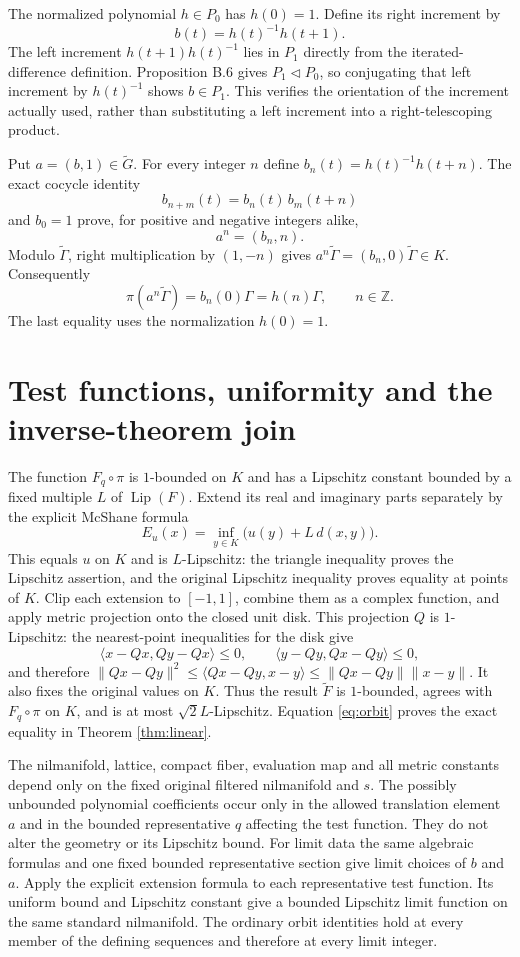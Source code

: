 \documentclass[11pt]{article}
\newcommand{\Z}{\mathbb Z}
\begin{document}
The normalized polynomial $h\in P_0$ has $h(0)=1$. Define its right
increment by
\[
 b(t)=h(t)^{-1}h(t+1).
\]
The left increment $h(t+1)h(t)^{-1}$ lies in $P_1$ directly from the
iterated-difference definition. Proposition B.6 gives $P_1\triangleleft
P_0$, so conjugating that left increment by $h(t)^{-1}$ shows
$b\in P_1$. This verifies the orientation of the increment actually
used, rather than substituting a left increment into a right-telescoping
product.

Put $a=(b,1)\in\widetilde G$. For every integer $n$ define
$b_n(t)=h(t)^{-1}h(t+n)$. The exact cocycle identity
\[
 b_{n+m}(t)=b_n(t)\,b_m(t+n)
\]
and $b_0=1$ prove, for positive and negative integers alike,
\[
 a^n=(b_n,n).
\]
Modulo $\widetilde\Gamma$, right multiplication by $(1,-n)$ gives
$a^n\widetilde\Gamma=(b_n,0)\widetilde\Gamma\in K$.
Consequently
\begin{equation}\label{eq:orbit}
 \pi(a^n\widetilde\Gamma)=b_n(0)\Gamma=h(n)\Gamma,
 \qquad n\in\Z.
\end{equation}
The last equality uses the normalization $h(0)=1$.

\section{Test functions, uniformity and the inverse-theorem join}

The function $F_q\circ\pi$ is $1$-bounded on $K$ and has a Lipschitz
constant bounded by a fixed multiple $L$ of $\operatorname{Lip}(F)$.
Extend its real and imaginary parts separately by the explicit McShane
formula
\[
 E_u(x)=\inf_{y\in K}\bigl(u(y)+L\,d(x,y)\bigr).
\]
This equals $u$ on $K$ and is $L$-Lipschitz: the triangle inequality
proves the Lipschitz assertion, and the original Lipschitz inequality
proves equality at points of $K$. Clip each extension to $[-1,1]$,
combine them as a complex function, and apply metric projection onto
the closed unit disk. This projection $Q$ is $1$-Lipschitz: the
nearest-point inequalities for the disk give
\[
 \langle x-Qx,Qy-Qx\rangle\leq0,\qquad
 \langle y-Qy,Qx-Qy\rangle\leq0,
\]
and therefore $\|Qx-Qy\|^2\leq\langle Qx-Qy,x-y\rangle
\leq\|Qx-Qy\|\|x-y\|$. It also fixes the original values on $K$.
Thus the result $\widetilde F$ is $1$-bounded, agrees with
$F_q\circ\pi$ on $K$, and is at most $\sqrt2 L$-Lipschitz.
Equation \eqref{eq:orbit} proves the exact equality in Theorem
\ref{thm:linear}.

The nilmanifold, lattice, compact fiber, evaluation map and all metric
constants depend only on the fixed original filtered nilmanifold and $s$.
The possibly unbounded polynomial coefficients occur only in the allowed
translation element $a$ and in the bounded representative $q$ affecting the
test function. They do not alter the geometry or its Lipschitz bound.
For limit data the same algebraic formulas and one fixed bounded
representative section give limit choices of $b$ and $a$. Apply the explicit
extension formula to each representative test function. Its uniform bound
and Lipschitz constant give a bounded Lipschitz limit function on the same
standard nilmanifold. The ordinary orbit identities hold at every member
of the defining sequences and therefore at every limit integer.
\end{document}
